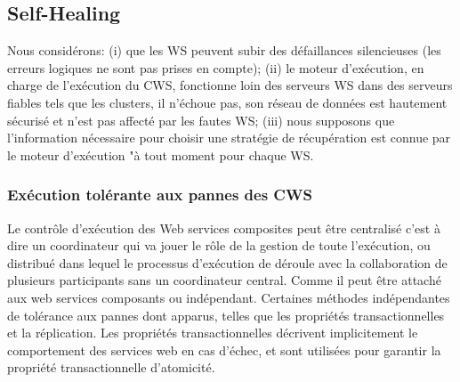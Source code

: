 
 
\subsection{Self-Healing}

Nous considérons: (i) que les WS peuvent subir des défaillances silencieuses (les erreurs logiques ne sont pas prises en compte); (ii) le moteur d'exécution, en charge de l'exécution du CWS, fonctionne loin des serveurs WS dans des serveurs fiables tels que les clusters, il n'échoue pas, son réseau de données est hautement sécurisé et n'est pas affecté par les fautes WS; (iii) nous supposons que l'information nécessaire pour choisir une stratégie de récupération est connue par le moteur d'exécution "à tout moment pour chaque WS. 



\subsubsection{Exécution tolérante aux pannes des CWS}

Le contrôle d'exécution des Web services composites peut être centralisé c’est à dire un coordinateur qui va jouer le rôle de la gestion de toute l’exécution,  ou distribué dans lequel le processus d’exécution de déroule avec la collaboration de plusieurs participants sans un coordinateur central. Comme il peut être attaché aux web services composants ou indépendant.
Certaines méthodes indépendantes de tolérance aux pannes dont apparus, telles que les propriétés transactionnelles et la réplication. Les propriétés transactionnelles décrivent implicitement le comportement des services web en cas d'échec, et sont utilisées pour garantir la propriété transactionnelle d’atomicité.
